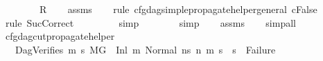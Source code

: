 \begin{isabellebody}
\ \ \ \ \ \ \ \ {\isachardoublequoteopen}R{\isachardoublequoteclose}\isanewline
%
\isadelimproof
\ \ %
\endisadelimproof
%
\isatagproof
{}\isamarkupfalse%
\ assms{\isacharparenleft}{\kern0pt}{}{\isacharminus}{\kern0pt}{}{\isacharparenright}{\kern0pt}\isanewline
\ \ \isamarkupfalse%
\ {\isacharparenleft}{\kern0pt}rule\ cfg{\isacharunderscore}{\kern0pt}dag{\isacharunderscore}{\kern0pt}simple{\isacharunderscore}{\kern0pt}propagate{\isacharunderscore}{\kern0pt}helper{\isacharunderscore}{\kern0pt}general{\isacharbrackleft}{\kern0pt}\ {\isacharquery}{\kern0pt}c{\isacharequal}{\kern0pt}False{\isacharbrackright}{\kern0pt}{\isacharparenright}{\kern0pt}\isanewline
\ \ \ \ \ \ \isamarkupfalse%
\ {\isacharparenleft}{\kern0pt}rule\ SucCorrect{\isacharparenright}{\kern0pt}\isanewline
\ \ \ \ \ \ \ \isamarkupfalse%
\ simp\isanewline
\ \ \ \ \ \ \isamarkupfalse%
\ simp\isanewline
\ \ \isamarkupfalse%
\ assms{\isacharparenleft}{\kern0pt}{}{\isacharminus}{\kern0pt}{\isacharparenright}{\kern0pt}\isanewline
\ \ \isamarkupfalse%
\ simp{\isacharunderscore}{\kern0pt}all%
\endisatagproof
{\isafoldproof}%
%
\isadelimproof
\isanewline
%
\endisadelimproof
\isanewline
{}\isamarkupfalse%
\ cfg{\isacharunderscore}{\kern0pt}dag{\isacharunderscore}{\kern0pt}cut{\isacharunderscore}{\kern0pt}propagate{\isacharunderscore}{\kern0pt}helper{\isacharcolon}{\kern0pt}\isanewline
\ \ \ DagVerifies{\isacharcolon}{\kern0pt}{\isachardoublequoteopen}{\isasymforall}\ m{}{\isacharprime}{\kern0pt}\ s{}{\isacharprime}{\kern0pt}{\isachardot}{\kern0pt}\ {\isacharparenleft}{\kern0pt}{\isacharparenleft}{\kern0pt}M{\isacharcomma}{\kern0pt}{\isasymLambda}{\isacharcomma}{\kern0pt}{\isasymGamma}{\isacharcomma}{\kern0pt}{\isasymOmega}{\isacharcomma}{\kern0pt}G\ {\isasymturnstile}\ {\isacharparenleft}{\kern0pt}Inl\ m{\isacharcomma}{\kern0pt}\ Normal\ ns{}{\isacharparenright}{\kern0pt}\ {\isacharminus}{\kern0pt}n{\isasymrightarrow}{\isacharasterisk}{\kern0pt}\ {\isacharparenleft}{\kern0pt}m{}{\isacharprime}{\kern0pt}{\isacharcomma}{\kern0pt}\ s{}{\isacharprime}{\kern0pt}{\isacharparenright}{\kern0pt}{\isacharparenright}{\kern0pt}\ {\isasymlongrightarrow}\ {\isacharparenleft}{\kern0pt}s{}{\isacharprime}{\kern0pt}\ {\isasymnoteq}\ Failure{\isacharparenright}{\kern0pt}{\isacharparenright}{\kern0pt}{\isachardoublequoteclose}\ \isanewline

\end{isabellebody}
